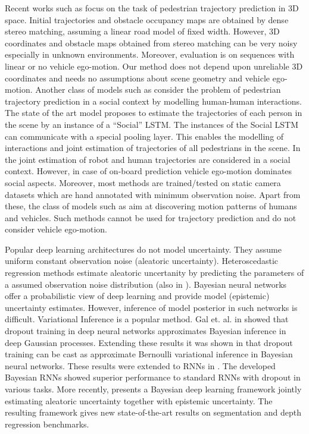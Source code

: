 Recent works such as \cite{keller2011will,rehder2015goal} focus on the task of pedestrian trajectory prediction in 3D space. Initial trajectories and obstacle occupancy maps are obtained by dense stereo matching, assuming a linear road model of fixed width. However, 3D coordinates and obstacle maps obtained from stereo matching can be very noisy especially in unknown environments. Moreover, evaluation is on sequences with linear or no vehicle ego-motion. Our method does not depend upon unreliable 3D coordinates and needs no assumptions about scene geometry and vehicle ego-motion. Another class of models such as \cite{helbing1995social,yamaguchi2011you,robicquet2016learning,alahi2016social} consider the problem of pedestrian trajectory prediction in a social context by modelling human-human interactions. The state of the art model \cite{alahi2016social} proposes to estimate the trajectories of each person in the scene by an instance of a ``Social'' LSTM. The instances of the Social LSTM can communicate with a special pooling layer. This enables the modelling of interactions and joint estimation of trajectories of all pedestrians in the scene. In \cite{trautman2013robot} the joint estimation of robot and human trajectories are considered in a social context. However, in case of on-board prediction vehicle ego-motion dominates social aspects. Moreover, most methods are trained/tested on static camera datasets which are hand annotated with minimum observation noise. Apart from these, the class of models such as \cite{hu2007semantic,kim2011gaussian,morris2011trajectory,zhou2011random,zhang2013understanding} aim at discovering motion patterns of humans and vehicles. Such methods cannot be used for trajectory prediction and do not consider vehicle ego-motion.

Popular deep learning architectures do not model uncertainty. They assume uniform constant observation noise (aleatoric uncertainty). Heteroscedastic regression methods \cite{nix1994estimating,le2005heteroscedastic}  estimate aleatoric uncertanity by predicting the parameters of a assumed observation noise distribution  (also in \cite{alahi2016social}). Bayesian neural networks \cite{mackay1992practical,neal2012bayesian} offer a probabilistic view of deep learning and provide model (epistemic) uncertainty estimates. However, inference of model posterior in such networks is difficult. Variational Inference is a popular method. Gal et. al. in \cite{gal2016dropout} showed that dropout training in deep neural networks approximates Bayesian inference in deep Gaussian processes. Extending these results it was shown in \cite{Gal2016Bayesian} that dropout training can be cast as approximate Bernoulli variational inference in Bayesian neural networks. These results were extended to RNNs in \cite{gal2016theoretically}. The developed Bayesian RNNs showed superior performance to standard RNNs with dropout in various tasks. More recently, \cite{kendall2017uncertainties} presents a Bayesian deep learning framework jointly estimating aleatoric uncertainty together with epistemic uncertainty. The resulting framework gives new state-of-the-art results on segmentation and depth regression benchmarks.

